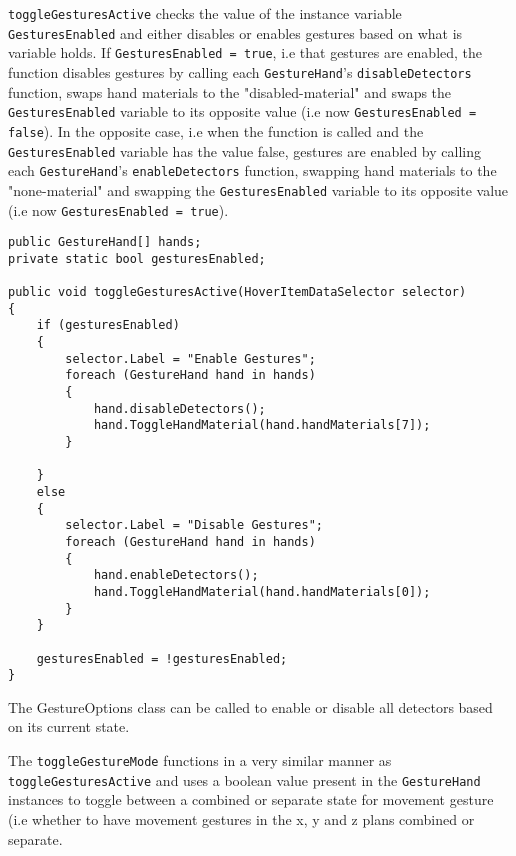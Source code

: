 \texttt{toggleGesturesActive} checks the value of the instance variable \texttt{GesturesEnabled} 
and either disables or enables gestures based on what is variable holds. If \texttt{GesturesEnabled = true}, i.e that gestures are enabled, the function 
disables gestures by calling each \texttt{GestureHand}'s \texttt{disableDetectors} function, swaps hand materials to the "disabled-material" and swaps the 
\texttt{GesturesEnabled} variable to its opposite value (i.e now \texttt{GesturesEnabled = false}). In the opposite case, i.e when the function is called and 
the \texttt{GesturesEnabled} variable has the value false, gestures are enabled by calling each \texttt{GestureHand}'s \texttt{enableDetectors} function, swapping
hand materials to the "none-material" and swapping the \texttt{GesturesEnabled} variable to its opposite value (i.e now \texttt{GesturesEnabled = true}). 

\begin{table}
\label{table:gesture_options_code}
\lstset{style=csharp}
\begin{lstlisting}
public GestureHand[] hands;
private static bool gesturesEnabled;

public void toggleGesturesActive(HoverItemDataSelector selector)
{
	if (gesturesEnabled)
	{
		selector.Label = "Enable Gestures";
		foreach (GestureHand hand in hands)
		{
			hand.disableDetectors();
			hand.ToggleHandMaterial(hand.handMaterials[7]);
		}

	}
	else
	{
		selector.Label = "Disable Gestures";
		foreach (GestureHand hand in hands)
		{
			hand.enableDetectors();
			hand.ToggleHandMaterial(hand.handMaterials[0]);
		}
	}

	gesturesEnabled = !gesturesEnabled;
}
\end{lstlisting}
\caption[The GestureOptions class]{The GestureOptions class can be called to enable or disable all detectors based on its current state.} 
\end{table}

The \texttt{toggleGestureMode} functions in a very similar manner as \texttt{toggleGesturesActive} and uses a boolean value present in the \texttt{GestureHand} instances
to toggle between a combined or separate state for movement gesture (i.e whether to have movement gestures in the x, y and z plans combined or separate.  